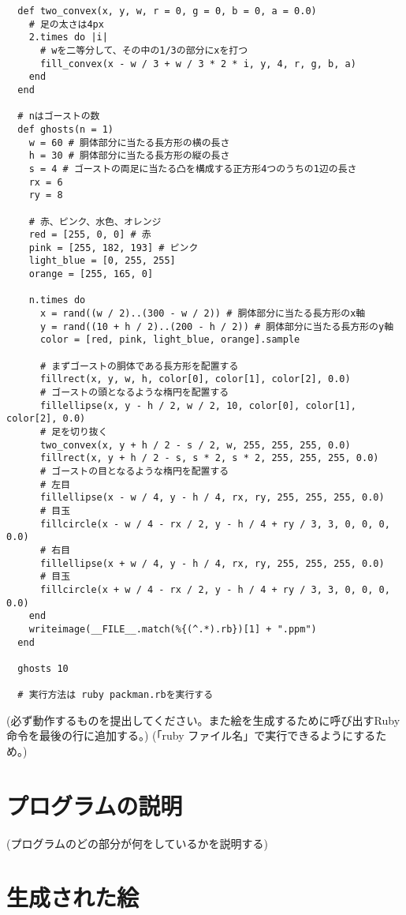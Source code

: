 \documentclass[12pt,a4j]{jarticle}
\begin{document}
\begin{verbatim}
  def two_convex(x, y, w, r = 0, g = 0, b = 0, a = 0.0)
    # 足の太さは4px
    2.times do |i|
      # wを二等分して、その中の1/3の部分にxを打つ
      fill_convex(x - w / 3 + w / 3 * 2 * i, y, 4, r, g, b, a)
    end
  end

  # nはゴーストの数
  def ghosts(n = 1)
    w = 60 # 胴体部分に当たる長方形の横の長さ
    h = 30 # 胴体部分に当たる長方形の縦の長さ
    s = 4 # ゴーストの両足に当たる凸を構成する正方形4つのうちの1辺の長さ
    rx = 6
    ry = 8

    # 赤、ピンク、水色、オレンジ
    red = [255, 0, 0] # 赤
    pink = [255, 182, 193] # ピンク
    light_blue = [0, 255, 255]
    orange = [255, 165, 0]

    n.times do
      x = rand((w / 2)..(300 - w / 2)) # 胴体部分に当たる長方形のx軸
      y = rand((10 + h / 2)..(200 - h / 2)) # 胴体部分に当たる長方形のy軸
      color = [red, pink, light_blue, orange].sample

      # まずゴーストの胴体である長方形を配置する
      fillrect(x, y, w, h, color[0], color[1], color[2], 0.0)
      # ゴーストの頭となるような楕円を配置する
      fillellipse(x, y - h / 2, w / 2, 10, color[0], color[1], color[2], 0.0)
      # 足を切り抜く
      two_convex(x, y + h / 2 - s / 2, w, 255, 255, 255, 0.0)
      fillrect(x, y + h / 2 - s, s * 2, s * 2, 255, 255, 255, 0.0)
      # ゴーストの目となるような楕円を配置する
      # 左目
      fillellipse(x - w / 4, y - h / 4, rx, ry, 255, 255, 255, 0.0)
      # 目玉
      fillcircle(x - w / 4 - rx / 2, y - h / 4 + ry / 3, 3, 0, 0, 0, 0.0)
      # 右目
      fillellipse(x + w / 4, y - h / 4, rx, ry, 255, 255, 255, 0.0)
      # 目玉
      fillcircle(x + w / 4 - rx / 2, y - h / 4 + ry / 3, 3, 0, 0, 0, 0.0)
    end
    writeimage(__FILE__.match(%{(^.*).rb})[1] + ".ppm")
  end

  ghosts 10

  # 実行方法は ruby packman.rbを実行する

\end{verbatim}
(必ず動作するものを提出してください。また絵を生成するために呼び出すRuby命令を最後の行に追加する。)
(「ruby ファイル名」で実行できるようにするため。)

\section{プログラムの説明}

(プログラムのどの部分が何をしているかを説明する)

\section{生成された絵}
\end{document}
